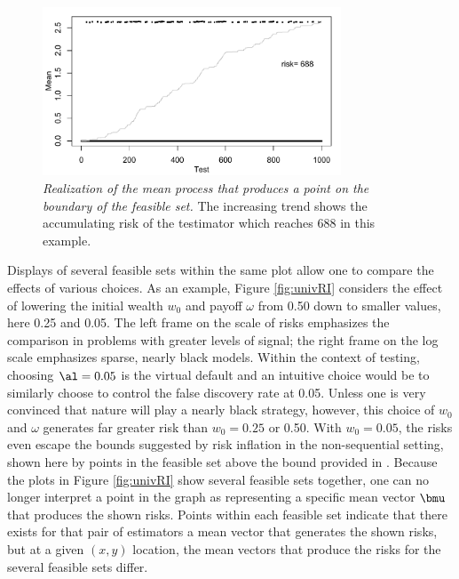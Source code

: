 \documentclass[12pt]{article}
\begin{document}
\begin{figure}
 \caption{ \label{fig:simRisk} {\sl Realization of the mean process that
 produces a point on the boundary of the feasible set.} The increasing trend
 shows the accumulating risk of the testimator which reaches 688 in this
 example.  }

 \vspace{0.1in}
 \centerline{
 \includegraphics[width=3.5in]{figures/simRisk}    }
 \vspace{0.2in}
\end{figure}


 Displays of several feasible sets within the same plot allow one to compare the
 effects of various choices.  As an example, Figure \ref{fig:univRI} considers
 the effect of lowering the initial wealth $w_0$ and payoff $\omega$ from 0.50
 down to smaller values, here 0.25 and 0.05.  The left frame on the scale of
 risks emphasizes the comparison in problems with greater levels of signal; the
 right frame on the log scale emphasizes sparse, nearly black models.  Within
 the context of testing, choosing $\al=0.05$ is the virtual default and an
 intuitive choice would be to similarly choose to control the false discovery
 rate at 0.05.  Unless one is very convinced that nature will play a nearly
 black strategy, however, this choice of $w_0$ and $\omega$ generates far
 greater risk than $w_0=0.25$ or 0.50.  With $w_0=0.05$, the risks even escape
 the bounds suggested by risk inflation in the non-sequential setting, shown
 here by points in the feasible set above the bound provided in .
  Because the plots in Figure \ref{fig:univRI} show several feasible sets
 together, one can no longer interpret a point in the graph as representing a
 specific mean vector $\bmu$ that produces the shown risks.  Points within each
 feasible set indicate that there exists for that pair of estimators a mean
 vector that generates the shown risks, but at a given $(x,y)$ location, the
 mean vectors that produce the risks for the several feasible sets differ.
\end{document}
